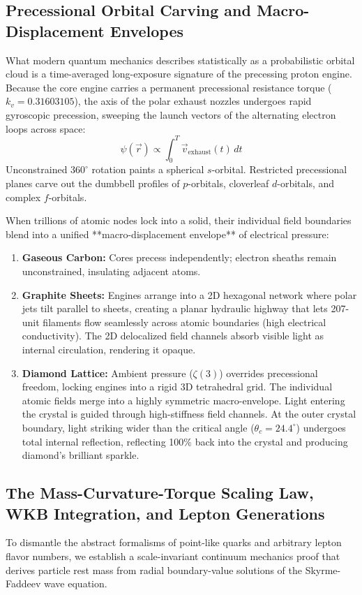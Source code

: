 \documentclass[11pt,a4paper]{article}
\begin{document}
	\subsection{Precessional Orbital Carving and Macro-Displacement Envelopes}
	What modern quantum mechanics describes statistically as a probabilistic orbital cloud is a time-averaged long-exposure signature of the precessing proton engine. Because the core engine carries a permanent precessional resistance torque ($k_v = 0.31603105$), the axis of the polar exhaust nozzles undergoes rapid gyroscopic precession, sweeping the launch vectors of the alternating electron loops across space:
	\begin{equation}
		\psi(\vec{r}) \propto \int_{0}^{T} \vec{v}_{\text{exhaust}}(t) \, dt
	\end{equation}
	Unconstrained $360^\circ$ rotation paints a spherical $s$-orbital. Restricted precessional planes carve out the dumbbell profiles of $p$-orbitals, cloverleaf $d$-orbitals, and complex $f$-orbitals.
	
	When trillions of atomic nodes lock into a solid, their individual field boundaries blend into a unified **macro-displacement envelope** of electrical pressure:
	\begin{enumerate}
		\item \textbf{Gaseous Carbon:} Cores precess independently; electron sheaths remain unconstrained, insulating adjacent atoms.
		\item \textbf{Graphite Sheets:} Engines arrange into a 2D hexagonal network where polar jets tilt parallel to sheets, creating a planar hydraulic highway that lets 207-unit filaments flow seamlessly across atomic boundaries (high electrical conductivity). The 2D delocalized field channels absorb visible light as internal circulation, rendering it opaque.
		\item \textbf{Diamond Lattice:} Ambient pressure ($\zeta(3)$) overrides precessional freedom, locking engines into a rigid 3D tetrahedral grid. The individual atomic fields merge into a highly symmetric macro-envelope. Light entering the crystal is guided through high-stiffness field channels. At the outer crystal boundary, light striking wider than the critical angle ($\theta_c = 24.4^\circ$) undergoes total internal reflection, reflecting 100\% back into the crystal and producing diamond's brilliant sparkle.
	\end{enumerate}
	
	\subsection{The Mass-Curvature-Torque Scaling Law, WKB Integration, and Lepton Generations}
	To dismantle the abstract formalisms of point-like quarks and arbitrary lepton flavor numbers, we establish a scale-invariant continuum mechanics proof that derives particle rest mass from radial boundary-value solutions of the Skyrme-Faddeev wave equation.
	
\end{document}
